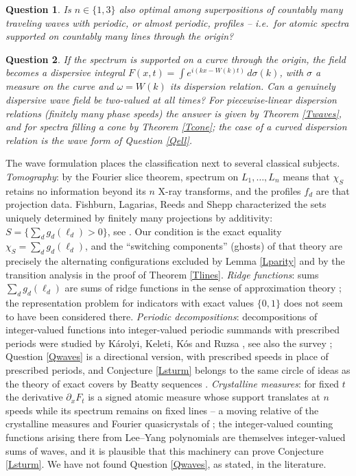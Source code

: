 \documentclass{article}
\newtheorem{question}{Question}
\begin{document}
	\begin{question}\label{Qcount}
		Is $n\in\{1,3\}$ also optimal among superpositions of countably many traveling waves with periodic, or almost periodic, profiles -- i.e.\ for atomic spectra supported on countably many lines through the origin?
	\end{question}

	\begin{question}\label{Qdisp}
		If the spectrum is supported on a curve through the origin, the field becomes a dispersive integral $F(x,t)=\int e^{i(kx-W(k)t)}\,d\sigma(k)$, with $\sigma$ a measure on the curve and $\omega=W(k)$ its dispersion relation. Can a genuinely dispersive wave field be two-valued at all times? For piecewise-linear dispersion relations (finitely many phase speeds) the answer is given by Theorem \ref{Twaves}, and for spectra filling a cone by Theorem \ref{Tcone}; the case of a curved dispersion relation is the wave form of Question \ref{Qell}.
	\end{question}

	The wave formulation places the classification next to several classical subjects. \emph{Tomography}: by the Fourier slice theorem, spectrum on $L_1,\dots,L_n$ means that $\chi_S$ retains no information beyond its $n$ X-ray transforms, and the profiles $f_d$ are that projection data. Fishburn, Lagarias, Reeds and Shepp characterized the sets uniquely determined by finitely many projections by additivity: $S=\{\sum_dg_d(\ell_d)>0\}$, see \cite{FLRS1, FLRS2}. Our condition is the exact equality $\chi_S=\sum_dg_d(\ell_d)$, and the ``switching components'' (ghosts) of that theory are precisely the alternating configurations excluded by Lemma \ref{Lparity} and by the transition analysis in the proof of Theorem \ref{Tlines}. \emph{Ridge functions}: sums $\sum_dg_d(\ell_d)$ are sums of ridge functions in the sense of approximation theory \cite{Pi}; the representation problem for indicators with exact values $\{0,1\}$ does not seem to have been considered there. \emph{Periodic decompositions}: decompositions of integer-valued functions into integer-valued periodic summands with prescribed periods were studied by K\'arolyi, Keleti, K\'os and Ruzsa \cite{KKKR}, see also the survey \cite{FR}; Question \ref{Qwaves} is a directional version, with prescribed speeds in place of prescribed periods, and Conjecture \ref{Lsturm} belongs to the same circle of ideas as the theory of exact covers by Beatty sequences \cite{Gr}. \emph{Crystalline measures}: for fixed $t$ the derivative $\partial_xF_t$ is a signed atomic measure whose support translates at $n$ speeds while its spectrum remains on fixed lines -- a moving relative of the crystalline measures and Fourier quasicrystals of \cite{LO, KS, AKKV}; the integer-valued counting functions arising there from Lee--Yang polynomials are themselves integer-valued sums of waves, and it is plausible that this machinery can prove Conjecture \ref{Lsturm}. We have not found Question \ref{Qwaves}, as stated, in the literature.
\end{document}

